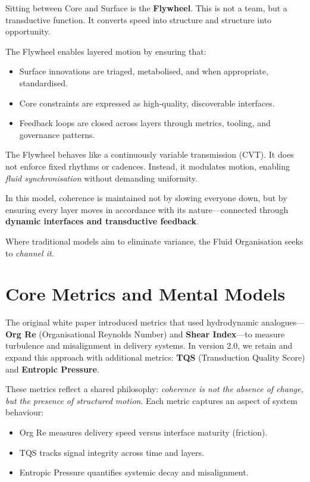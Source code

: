 \documentclass[12pt]{article}
\begin{document}
Sitting between Core and Surface is the \textbf{Flywheel}. This is not a team, but a transductive function. It converts speed into structure and structure into opportunity.

The Flywheel enables layered motion by ensuring that:
\begin{itemize}
    \item Surface innovations are triaged, metabolised, and when appropriate, standardised.
    \item Core constraints are expressed as high-quality, discoverable interfaces.
    \item Feedback loops are closed across layers through metrics, tooling, and governance patterns.
\end{itemize}

The Flywheel behaves like a continuously variable transmission (CVT). It does not enforce fixed rhythms or cadences. Instead, it modulates motion, enabling \textit{fluid synchronisation} without demanding uniformity.

In this model, coherence is maintained not by slowing everyone down, but by ensuring every layer moves in accordance with its nature---connected through \textbf{dynamic interfaces and transductive feedback}.

Where traditional models aim to eliminate variance, the Fluid Organisation seeks to \textit{channel it}.

\section{Core Metrics and Mental Models}

The original white paper introduced metrics that used hydrodynamic analogues—\textbf{Org Re} (Organisational Reynolds Number) and \textbf{Shear Index}—to measure turbulence and misalignment in delivery systems. In version 2.0, we retain and expand this approach with additional metrics: \textbf{TQS} (Transduction Quality Score) and \textbf{Entropic Pressure}.

These metrics reflect a shared philosophy: \textit{coherence is not the absence of change, but the presence of structured motion}. Each metric captures an aspect of system behaviour:
\begin{itemize}
    \item Org Re measures delivery speed versus interface maturity (friction).
    \item TQS tracks signal integrity across time and layers.
    \item Entropic Pressure quantifies systemic decay and misalignment.
\end{itemize}
\end{document}
